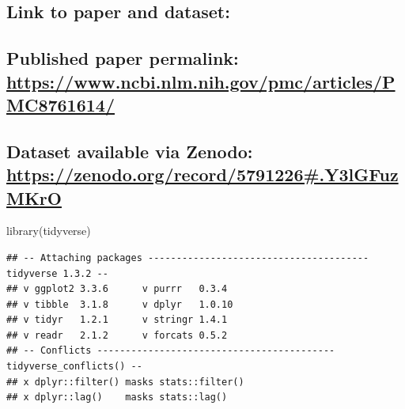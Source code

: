 \documentclass[
]{article}
\newenvironment{Shaded}{\begin{snugshade}}{\end{snugshade}}
\newcommand{\FunctionTok}[1]{\textcolor[rgb]{0.00,0.00,0.00}{#1}}
\newcommand{\NormalTok}[1]{#1}
\begin{document}
\hypertarget{link-to-paper-and-dataset}{%
\subsection{Link to paper and
dataset:}\label{link-to-paper-and-dataset}}

\hypertarget{published-paper-permalink-httpswww.ncbi.nlm.nih.govpmcarticlespmc8761614}{%
\subsection{\texorpdfstring{Published paper permalink:
\url{https://www.ncbi.nlm.nih.gov/pmc/articles/PMC8761614/}}{Published paper permalink: https://www.ncbi.nlm.nih.gov/pmc/articles/PMC8761614/}}\label{published-paper-permalink-httpswww.ncbi.nlm.nih.govpmcarticlespmc8761614}}

\hypertarget{dataset-available-via-zenodo-httpszenodo.orgrecord5791226.y3lgfuzmkro}{%
\subsection{\texorpdfstring{Dataset available via Zenodo:
\url{https://zenodo.org/record/5791226\#.Y3lGFuzMKrO}}{Dataset available via Zenodo: https://zenodo.org/record/5791226\#.Y3lGFuzMKrO}}\label{dataset-available-via-zenodo-httpszenodo.orgrecord5791226.y3lgfuzmkro}}

\begin{Shaded}
\begin{Highlighting}[]
\FunctionTok{library}\NormalTok{(tidyverse)}
\end{Highlighting}
\end{Shaded}

\begin{verbatim}
## -- Attaching packages --------------------------------------- tidyverse 1.3.2 --
## v ggplot2 3.3.6      v purrr   0.3.4 
## v tibble  3.1.8      v dplyr   1.0.10
## v tidyr   1.2.1      v stringr 1.4.1 
## v readr   2.1.2      v forcats 0.5.2 
## -- Conflicts ------------------------------------------ tidyverse_conflicts() --
## x dplyr::filter() masks stats::filter()
## x dplyr::lag()    masks stats::lag()
\end{verbatim}
\end{document}
